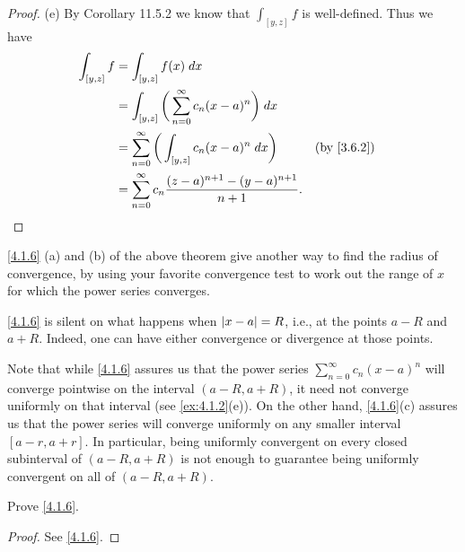 \begin{proof}{(e)}
  By Corollary 11.5.2 we know that \(\int_{[y, z]} f\) is well-defined.
  Thus we have
  \begin{align*}
    \int_{[y, z]} f & = \int_{[y, z]} f(x) \; dx                                                                  \\
                    & = \int_{[y, z]} \bigg(\sum_{n = 0}^\infty c_n (x - a)^n\bigg) \; dx                         \\
                    & = \sum_{n = 0}^\infty \bigg(\int_{[y, z]} c_n (x - a)^n \; dx\bigg)         &  & \by{3.6.2} \\
                    & = \sum_{n = 0}^\infty c_n \dfrac{(z - a)^{n + 1} - (y - a)^{n + 1}}{n + 1}.
  \end{align*}
\end{proof}

\begin{note}
  \cref{4.1.6} (a) and (b) of the above theorem give another way to find the radius of convergence, by using your favorite convergence test to work out the range of \(x\) for which the power series converges.
\end{note}

\setcounter{thm}{7}
\begin{rmk}\label{4.1.8}
  \cref{4.1.6} is silent on what happens when \(\left\lvert x - a\right\rvert = R\), i.e., at the points \(a - R\) and \(a + R\).
  Indeed, one can have either convergence or divergence at those points.
\end{rmk}

\begin{rmk}\label{4.1.9}
  Note that while \cref{4.1.6} assures us that the power series \(\sum_{n = 0}^\infty c_n (x - a)^n\) will converge pointwise on the interval \((a - R, a + R)\), it need not converge uniformly on that interval
  (see \cref{ex:4.1.2}(e)).
  On the other hand, \cref{4.1.6}(c) assures us that the power series will converge uniformly on any smaller interval \([a - r, a + r]\).
  In particular, being uniformly convergent on every closed subinterval of \((a - R, a + R)\) is not enough to guarantee being uniformly convergent on all of \((a - R, a + R)\).
\end{rmk}

\exercisesection

\begin{ex}\label{ex:4.1.1}
  Prove \cref{4.1.6}.
\end{ex}

\begin{proof}
  See \cref{4.1.6}.
\end{proof}

